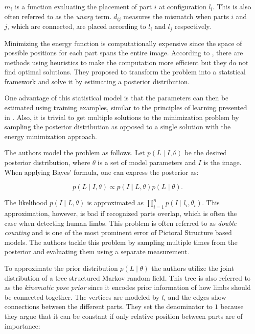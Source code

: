 $m_i$ is a function evaluating the placement of part $i$ at configuration $l_i$.
This is also often referred to as the \textit{unary} term.
$d_{ij}$ measures the mismatch when parts $i$ and $j$, which are connected, are placed according to $l_i$ and $l_j$ respectively.

Minimizing the energy function is computationally expensive since the space of possible positions for each part spans the entire image.
According to \cite{felzenszwalb_pictorial_2005}, there are methods using heuristics to make the computation more efficient but they do not find optimal solutions.
They proposed to transform the problem into a statstical framework and solve it by estimating a posterior distribution.

One advantage of this statistical model is that the parameters can then be estimated using training examples, similar to the principles of learning presented in .
Also, it is trivial to get multiple solutions to the minimization problem by sampling the posterior distribution as opposed to a single solution with the energy minimization approach.

The authors model the problem as follows.
Let $p(L \mid I, \theta)$ be the desired posterior distribution, where $\theta$ is a set of model parameters and $I$ is the image.
When applying Bayes' formula, one can express the posterior as:

\begin{equation}
    p(L \mid I, \theta) \propto p(I \mid L, \theta) p(L \mid \theta).
\end{equation}

The likelihood $p(I \mid L, \theta)$ is approximated as $\prod_{i=1}^n p(I \mid l_i, \theta_i)$.
This approximation, however, is bad if recognized parts overlap, which is often the case when detecting human limbs.
This problem is often referred to as \textit{double counting} and is one of the most prominent error of Pictoral Structure based models.
The authors tackle this problem by sampling multiple times from the posterior and evaluating them using a separate measurement.

To approximate the prior distribution $p(L \mid \theta)$ the authors utilize the joint distribution of a tree structured Markov random field.
This tree is also referred to as the \textit{kinematic pose prior} since it encodes prior information of how limbs should be connected together.
The vertices are modeled by $l_i$ and the edges show connections between the different parts. 
They set the denominator to $1$ because they argue that it can be constant if only relative position between parts are of importance:

